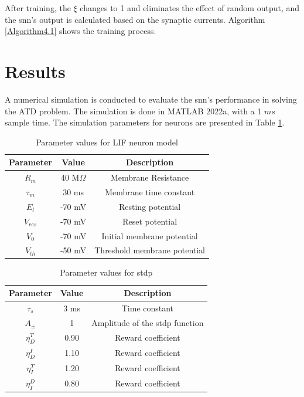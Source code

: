 After training, the $\xi$ changes to 1 and eliminates the effect of random output, and the \ac{snn}'s output is calculated based on the synaptic currents. Algorithm \ref{Algorithm4.1} shows the training process.

\section{Results}

A numerical simulation is conducted to evaluate the \ac{snn}'s performance in solving the ATD problem. The simulation is done in MATLAB 2022a, with a 1 $ms$ sample time. The simulation parameters for neurons are presented in Table \ref{Table4.1}.

\begin{table}[h]
\caption{Parameter values for LIF neuron model \cite{Ch_1_R10}}
\begin{center}
\begingroup
\setlength{\tabcolsep}{10pt} %
\renewcommand{\arraystretch}{1.5} %
\begin{tabular}{|ccc|}
\hline
\textbf{Parameter} & \textbf{Value} & \textbf{Description}\\
\hline
\textit{$R_{m}$} & 40 M$\Omega$ & Membrane Resistance\\
\textit{$\tau_{m}$} & 30 ms & Membrane time constant\\
\textit{$E_{l}$} & -70 mV & Resting potential\\
\textit{$V_{res}$} & -70 mV & Reset potential\\
\textit{$V_{0}$} & -70 mV & Initial membrane potential\\
\textit{$V_{th}$} & -50 mV & Threshold membrane potential\\
\hline
\end{tabular}
\endgroup
\label{Table4.1}
\end{center}
\end{table}

\begin{table}[h]
\caption{Parameter values for \ac{stdp}}
\begin{center}
\begingroup
\setlength{\tabcolsep}{10pt} %
\renewcommand{\arraystretch}{1.5} %
\begin{tabular}{|ccc|}
\hline
\textbf{Parameter} & \textbf{Value} & \textbf{Description}\\
\hline
\textit{$\tau_{s}$} & 3 ms & Time constant\\
\textit{$A_{\pm}$} & 1 & Amplitude of the \ac{stdp} function\\
\textit{$\eta_{D}^{T}$} & 0.90 & Reward coefficient\\
\textit{$\eta_{D}^{I}$} & 1.10 & Reward coefficient\\
\textit{$\eta_{I}^{T}$} & 1.20 & Reward coefficient\\
\textit{$\eta_{I}^{D}$} & 0.80 & Reward coefficient\\
\hline
\end{tabular}
\endgroup
\label{Table4.2}
\end{center}
\end{table}

